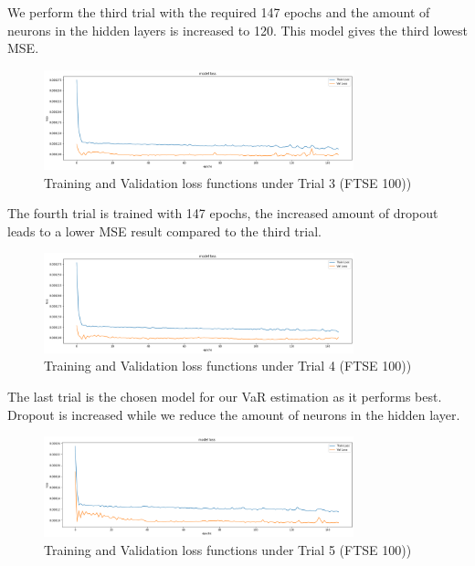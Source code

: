\documentclass[a4paper,11pt,oneside]{book}
\begin{document}
 We perform the third trial with the required 147 epochs and the amount of neurons in the hidden layers is increased to 120. This model gives the third lowest MSE.

\begin{figure}[!h]
	\centering
	\includegraphics[width=0.8\textwidth]{figures/FTSE3}
	\caption{Training and Validation loss functions under Trial 3 (FTSE 100))}
	\label{FTSE3}
\end{figure}
 The fourth trial is trained with 147 epochs, the increased amount of dropout leads to a lower MSE result compared to the third trial. \newline\newline\newline\newline\newline\newline

\begin{figure}[!h]
	\centering
	\includegraphics[width=0.8\textwidth]{figures/FTSE4}
	\caption{Training and Validation loss functions under Trial 4 (FTSE 100))}
	\label{FTSE4}
\end{figure}

 The last trial is the chosen model for our VaR estimation as it performs best. Dropout is increased while we reduce the amount of neurons in the hidden layer. 
\begin{figure}[!h]
	\centering
	\includegraphics[width=0.8\textwidth]{figures/FTSE5}
	\caption{Training and Validation loss functions under Trial 5 (FTSE 100))}
	\label{FTSE5}
\end{figure}
 
\end{document}
